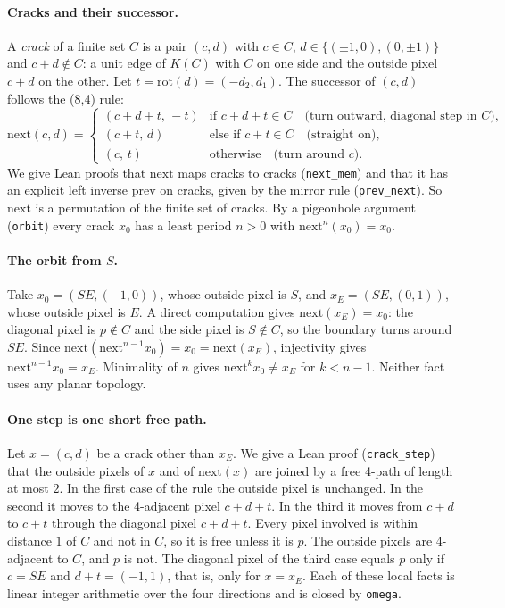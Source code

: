\documentclass[11pt]{article}
\theoremstyle{definition}
\theoremstyle{remark}
\begin{document}
\paragraph{Cracks and their successor.} A \emph{crack} of a finite set $C$ is a pair
$(c,d)$ with $c\in C$, $d\in\{(\pm1,0),(0,\pm1)\}$ and $c+d\notin C$: a unit edge of
$K(C)$ with $C$ on one side and the outside pixel $c+d$ on the other. Let
$t=\mathrm{rot}(d)=(-d_2,d_1)$. The successor of $(c,d)$ follows the (8,4) rule:
\[
  \mathrm{next}(c,d)=\begin{cases}
  (c+d+t,\,-t) & \text{if } c+d+t\in C \quad\text{(turn outward, diagonal step in } C),\\
  (c+t,\,d) & \text{else if } c+t\in C \quad\text{(straight on)},\\
  (c,\,t) & \text{otherwise}\quad\text{(turn around } c).
  \end{cases}
\]
We give Lean proofs that $\mathrm{next}$ maps cracks to cracks (\texttt{next\_mem}) and
that it has an explicit left inverse $\mathrm{prev}$ on cracks, given by the mirror rule
(\texttt{prev\_next}). So $\mathrm{next}$ is a permutation of the finite set of cracks. By
a pigeonhole argument (\texttt{orbit}) every crack $x_0$ has a least period $n>0$ with
$\mathrm{next}^n(x_0)=x_0$.

\paragraph{The orbit from $S$.} Take $x_0=(SE,(-1,0))$, whose outside pixel is $S$,
and $x_E=(SE,(0,1))$, whose outside pixel is $E$. A direct computation gives
$\mathrm{next}(x_E)=x_0$: the diagonal pixel is $p\notin C$ and the side pixel is
$S\notin C$, so the boundary turns around $SE$. Since
$\mathrm{next}(\mathrm{next}^{n-1}x_0)=x_0=\mathrm{next}(x_E)$, injectivity gives
$\mathrm{next}^{n-1}x_0=x_E$. Minimality of $n$ gives $\mathrm{next}^{k}x_0\ne x_E$ for
$k<n-1$. Neither fact uses any planar topology.

\paragraph{One step is one short free path.} Let $x=(c,d)$ be a crack other than $x_E$.
We give a Lean proof (\texttt{crack\_step}) that the outside pixels of $x$ and of
$\mathrm{next}(x)$ are joined by a free 4-path of length at most $2$. In the first case
of the rule the outside pixel is unchanged. In the second it moves to the 4-adjacent
pixel $c+d+t$. In the third it moves from $c+d$ to $c+t$ through the diagonal pixel
$c+d+t$. Every pixel involved is within distance $1$ of $C$ and not in $C$, so it is
free unless it is $p$. The outside pixels are 4-adjacent to $C$, and $p$ is not. The diagonal pixel of
the third case equals $p$ only if $c=SE$ and $d+t=(-1,1)$, that is, only for $x=x_E$. Each
of these local facts is linear integer arithmetic over the four directions and is
closed by \texttt{omega}.
\end{document}
